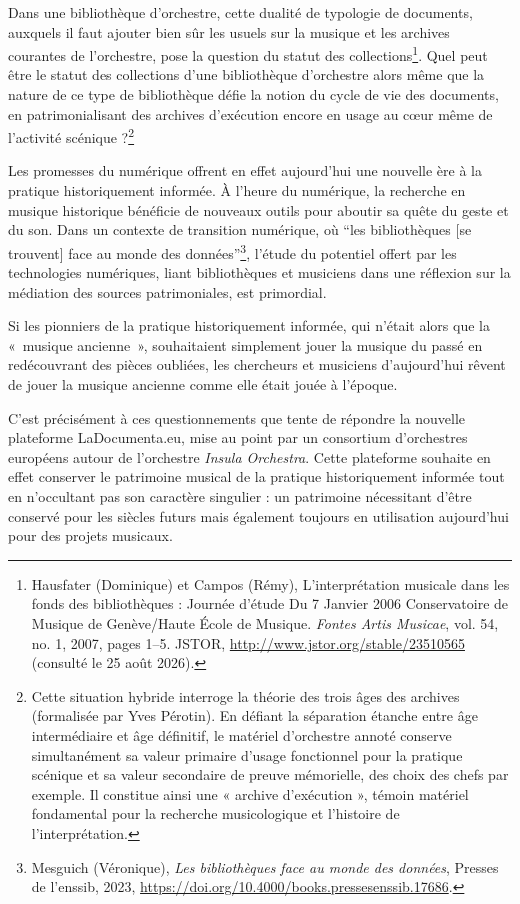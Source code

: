 Dans une bibliothèque d’orchestre, cette dualité de typologie de documents, auxquels il faut ajouter bien sûr les usuels sur la musique et les archives courantes de l’orchestre, pose la question du statut des collections\footnote{Hausfater (Dominique) et Campos (Rémy), L’interprétation musicale dans les fonds des bibliothèques : Journée d’étude Du 7 Janvier 2006 Conservatoire de Musique de Genève/Haute École de Musique. \textit{Fontes Artis Musicae}, vol. 54, no. 1, 2007, pages 1–5. JSTOR, \url{http://www.jstor.org/stable/23510565} (consulté le 25 août 2026).}.
Quel peut être le statut des collections d’une bibliothèque d’orchestre alors même que la nature de ce type de bibliothèque défie la notion du cycle de vie des documents, en patrimonialisant des archives d'exécution encore en usage au cœur même de l'activité scénique ?\footnote{Cette situation hybride interroge la théorie des trois âges des archives (formalisée par Yves Pérotin). En défiant la séparation étanche entre âge intermédiaire et âge définitif, le matériel d'orchestre annoté conserve simultanément sa valeur primaire d'usage fonctionnel pour la pratique scénique et sa valeur secondaire de preuve mémorielle, des choix des chefs par exemple. Il constitue ainsi une « archive d'exécution », témoin matériel fondamental pour la recherche musicologique et l'histoire de l'interprétation.}

\bigskip Les promesses du numérique offrent en effet aujourd'hui une nouvelle ère à la pratique historiquement informée. À l'heure du numérique, la recherche en musique historique bénéficie de nouveaux outils pour aboutir sa quête du geste et du son. Dans un contexte de transition numérique, où \enquote{les bibliothèques [se trouvent] face au monde des données}\footnote{Mesguich (Véronique), \textit{Les bibliothèques face au monde des données}, Presses de l’enssib, 2023, \url{https://doi.org/10.4000/books.pressesenssib.17686}.}, l'étude du potentiel offert par les technologies numériques, liant bibliothèques et musiciens dans une réflexion sur la médiation des sources patrimoniales, est primordial. 

\smallskip\indent Si les pionniers de la pratique historiquement informée, qui n’était alors que la «~musique ancienne~», souhaitaient simplement jouer la musique du passé en redécouvrant des pièces oubliées, les chercheurs et musiciens d’aujourd’hui rêvent de jouer la musique ancienne comme elle était jouée à l’époque.

\bigskip C’est précisément à ces questionnements que tente de répondre la nouvelle plateforme LaDocumenta.eu, mise au point par un consortium d’orchestres européens autour de l’orchestre \textit{Insula Orchestra}. Cette plateforme souhaite en effet conserver le patrimoine musical de la pratique historiquement informée tout en n’occultant pas son caractère singulier : un patrimoine nécessitant d’être conservé pour les siècles futurs mais également toujours en utilisation aujourd’hui pour des projets musicaux.

